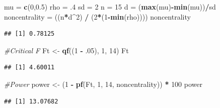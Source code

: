 \documentclass[]{book}
\newenvironment{Shaded}{\begin{snugshade}}{\end{snugshade}}
\newcommand{\CommentTok}[1]{\textcolor[rgb]{0.56,0.35,0.01}{\textit{#1}}}
\newcommand{\DecValTok}[1]{\textcolor[rgb]{0.00,0.00,0.81}{#1}}
\newcommand{\FloatTok}[1]{\textcolor[rgb]{0.00,0.00,0.81}{#1}}
\newcommand{\KeywordTok}[1]{\textcolor[rgb]{0.13,0.29,0.53}{\textbf{#1}}}
\newcommand{\NormalTok}[1]{#1}
\newcommand{\OperatorTok}[1]{\textcolor[rgb]{0.81,0.36,0.00}{\textbf{#1}}}
\newcommand{\StringTok}[1]{\textcolor[rgb]{0.31,0.60,0.02}{#1}}
\begin{document}
\begin{Shaded}
\begin{Highlighting}[]
\NormalTok{mu =}\StringTok{ }\KeywordTok{c}\NormalTok{(}\DecValTok{0}\NormalTok{,}\FloatTok{0.5}\NormalTok{)}
\NormalTok{rho =}\StringTok{ }\FloatTok{.4}
\NormalTok{sd =}\StringTok{ }\DecValTok{2}
\NormalTok{n =}\StringTok{ }\DecValTok{15}
\NormalTok{d =}\StringTok{ }\NormalTok{(}\KeywordTok{max}\NormalTok{(mu)}\OperatorTok{-}\KeywordTok{min}\NormalTok{(mu))}\OperatorTok{/}\NormalTok{sd}
\NormalTok{noncentrality =}\StringTok{ }\NormalTok{((n}\OperatorTok{*}\NormalTok{d}\OperatorTok{^}\DecValTok{2}\NormalTok{) }\OperatorTok{/}\StringTok{ }\NormalTok{(}\DecValTok{2}\OperatorTok{*}\NormalTok{(}\DecValTok{1}\OperatorTok{-}\KeywordTok{min}\NormalTok{(rho))))}
\NormalTok{noncentrality}
\end{Highlighting}
\end{Shaded}

\begin{verbatim}
## [1] 0.78125
\end{verbatim}

\begin{Shaded}
\begin{Highlighting}[]
\CommentTok{#Critical F}
\NormalTok{Ft <-}\StringTok{ }\KeywordTok{qf}\NormalTok{((}\DecValTok{1} \OperatorTok{-}\StringTok{ }\FloatTok{.05}\NormalTok{), }\DecValTok{1}\NormalTok{, }\DecValTok{14}\NormalTok{)}
\NormalTok{Ft}
\end{Highlighting}
\end{Shaded}

\begin{verbatim}
## [1] 4.60011
\end{verbatim}

\begin{Shaded}
\begin{Highlighting}[]
\CommentTok{#Power}
\NormalTok{power <-}\StringTok{ }\NormalTok{(}\DecValTok{1} \OperatorTok{-}\StringTok{ }\KeywordTok{pf}\NormalTok{(Ft,}
                 \DecValTok{1}\NormalTok{,}
                 \DecValTok{14}\NormalTok{,}
\NormalTok{                 noncentrality)) }\OperatorTok{*}\StringTok{ }\DecValTok{100}
\NormalTok{power}
\end{Highlighting}
\end{Shaded}

\begin{verbatim}
## [1] 13.07682
\end{verbatim}

\newpage
\end{document}
